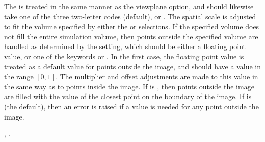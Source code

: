 \begin{description}
The  is treated in the same manner as the
 viewplane option, and should
likewise take one of the three two-letter codes  (default),
 or .  The spatial scale is adjusted to fit the volume
specified by either the  or
 selections.  If the specified volume
does not fill the entire simulation volume, then points outside the
specified volume are handled as determined by the 
setting, which should be either a floating point value, or one of the
keywords  or .  In the first case, the floating
point value is treated as a default value for points outside the image,
and should have a value in the range $[0,1]$.  The multiplier and offset
adjustments are made to this value in the same way as to points inside
the image.  If  is , then points outside the
image are filled with the value of the closest point on the boundary of
the image.  If  is  (the default), then an error
is raised if a value is needed for any point outside the image.

\begin{ExampleMifs}
  , .
\end{ExampleMifs}

\end{description}

